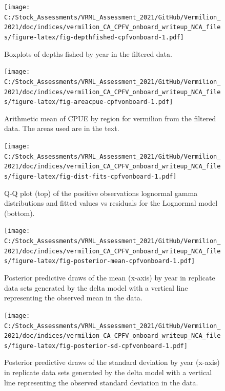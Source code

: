 \documentclass[11pt,
  english,
]{article}
\begin{document}
\FloatBarrier

\begin{figure}
\centering
\texttt{[image: C:/Stock\_Assessments/VRML\_Assessment\_2021/GitHub/Vermilion\_2021/doc/indices/vermilion\_CA\_CPFV\_onboard\_writeup\_NCA\_files/figure-latex/fig-depthfished-cpfvonboard-1.pdf]}
\caption{\label{fig:fig-depthfished-cpfvonboard}Boxplots of depths fished by year in the filtered data.}
\end{figure}

\FloatBarrier

\begin{figure}
\centering
\texttt{[image: C:/Stock\_Assessments/VRML\_Assessment\_2021/GitHub/Vermilion\_2021/doc/indices/vermilion\_CA\_CPFV\_onboard\_writeup\_NCA\_files/figure-latex/fig-areacpue-cpfvonboard-1.pdf]}
\caption{\label{fig:fig-areacpue-cpfvonboard}Arithmetic mean of CPUE by region for vermilion from the filtered data. The areas used are in the text.}
\end{figure}

\begin{figure}
\centering
\texttt{[image: C:/Stock\_Assessments/VRML\_Assessment\_2021/GitHub/Vermilion\_2021/doc/indices/vermilion\_CA\_CPFV\_onboard\_writeup\_NCA\_files/figure-latex/fig-dist-fits-cpfvonboard-1.pdf]}
\caption{\label{fig:fig-dist-fits-cpfvonboard}Q-Q plot (top) of the positive observations lognormal gamma distributions and fitted values vs residuals for the Lognormal model (bottom).}
\end{figure}

\begin{figure}
\centering
\texttt{[image: C:/Stock\_Assessments/VRML\_Assessment\_2021/GitHub/Vermilion\_2021/doc/indices/vermilion\_CA\_CPFV\_onboard\_writeup\_NCA\_files/figure-latex/fig-posterior-mean-cpfvonboard-1.pdf]}
\caption{\label{fig:fig-posterior-mean-cpfvonboard}Posterior predictive draws of the mean (x-axis) by year in replicate data sets generated by the delta model with a vertical line representing the observed mean in the data.}
\end{figure}

\FloatBarrier

\begin{figure}
\centering
\texttt{[image: C:/Stock\_Assessments/VRML\_Assessment\_2021/GitHub/Vermilion\_2021/doc/indices/vermilion\_CA\_CPFV\_onboard\_writeup\_NCA\_files/figure-latex/fig-posterior-sd-cpfvonboard-1.pdf]}
\caption{\label{fig:fig-posterior-sd-cpfvonboard}Posterior predictive draws of the standard deviation by year (x-axis) in replicate data sets generated by the delta model with a vertical line representing the observed standard deviation in the data.}
\end{figure}
\end{document}
